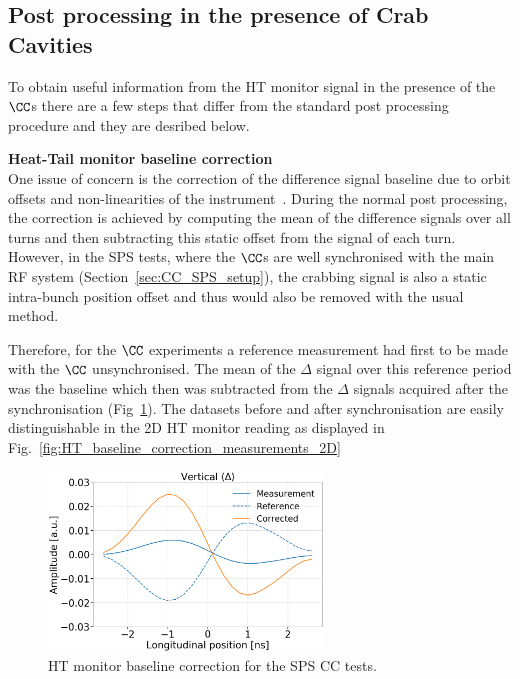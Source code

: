 \subsection{Post processing in the presence of Crab Cavities}\label{subsec:HT_post_process_CC}
To obtain useful information from the HT monitor signal in the presence of the $\CC$s there are a few steps that differ from the standard post processing procedure and they are desribed below.

\normalsize{\textbf{Heat-Tail monitor baseline correction}}\\
One issue of concern is the correction of the difference signal  baseline due to orbit offsets and non-linearities of the instrument~\cite{Levens:2313358}. During the normal post processing, the correction is achieved by computing the mean of the difference signals over all turns and then subtracting this static offset from the signal of each turn. However, in the SPS tests, where the $\CC$s are well synchronised with the main RF system (Section~\ref{sec:CC_SPS_setup}), the crabbing signal is also a static intra-bunch position offset and thus would also be removed with the usual method.

Therefore, for the $\CC$ experiments a reference measurement had first to be made with the $\CC$ unsynchronised. The mean of the $\Delta$ signal over this reference period was the baseline which then was subtracted from the $\Delta$ signals acquired after the synchronisation (Fig~\ref{fig:HT_baseline_correction}). The datasets before and after synchronisation are easily distinguishable in the 2D HT monitor reading as displayed in Fig.~\ref{fig:HT_baseline_correction_measurements_2D}


\begin{figure}[!h]
   \centering         
   \includegraphics[width=0.65\textwidth]{images/Ch4/HT_measures_vs_reference_vs_corrected__20180530_135105_baseline_correction_new_version.png}
       \caption{HT monitor baseline correction for the SPS CC tests.}
       \label{fig:HT_baseline_correction}
\end{figure}

